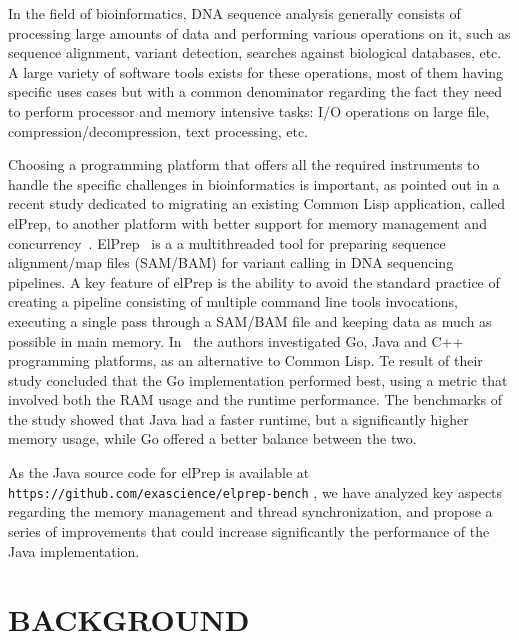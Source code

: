 \documentclass[a4paper,twoside]{article}
\begin{document}
In the field of bioinformatics, DNA sequence analysis generally consists of processing large amounts of data and performing various operations on it, 
such as sequence alignment, variant detection, searches against biological databases, etc.
A large variety of software tools exists for these operations, most of them having specific uses cases but with a common denominator 
regarding the fact they need to perform processor and memory intensive tasks: 
I/O operations on large file, compression/decompression, text processing, etc.~\cite{?}

Choosing a programming platform that offers all the required instruments to handle the specific challenges in bioinformatics is important, 
as pointed out in a recent study dedicated to migrating an existing Common Lisp application, called elPrep, 
to another platform with better support for memory management and concurrency~\cite{costanza:2019}.
ElPrep~\cite{herzeel:2019} is a a multithreaded tool for preparing sequence alignment/map files (SAM/BAM)
for variant calling in DNA sequencing pipelines. 
A key feature of elPrep is the ability to avoid the standard practice of creating a pipeline consisting of multiple command line tools invocations, 
executing a single pass through a SAM/BAM file and keeping data as much as possible in main memory.
In~\cite{costanza:2019} the authors investigated Go, Java and C++ programming platforms, as an alternative to Common Lisp.
Te result of their study concluded that the Go implementation performed best, using a metric that involved both the RAM usage and the runtime performance.
The benchmarks of the study showed that Java had a faster runtime, but a significantly higher memory usage, while Go offered a better balance between the two.

As the Java source code for elPrep is available at {\texttt{https://github.com/exascience/elprep-bench} }, we have analyzed key aspects regarding the memory management and
thread synchronization, and propose a series of improvements that could increase significantly the performance of the Java implementation. 


\section{\uppercase{Background}}\label{sec:uppercase5}
\end{document}
